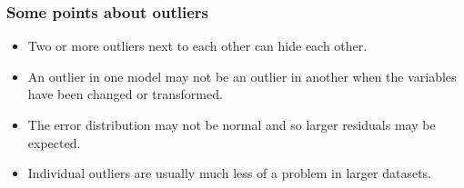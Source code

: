 \documentclass[10pt]{beamer} %
\begin{document}
\begin{frame}
   \frametitle{Some points about outliers}
   \begin{itemize}
      \item Two or more outliers next to each other can hide each other.
      \item An outlier in one model may not be an outlier in another when the
         variables have been changed or transformed. 
      \item The error distribution may not be normal and so larger residuals may be expected.
      \item Individual outliers are usually much less of a problem in larger datasets. 
   \end{itemize}
\end{frame}
\end{document}
